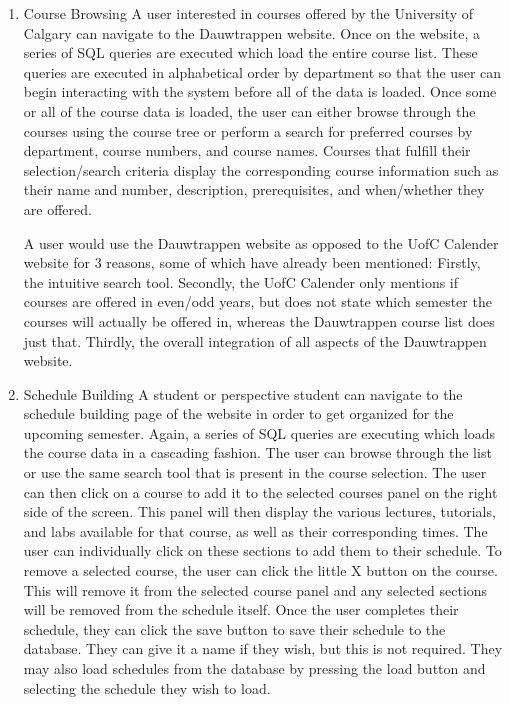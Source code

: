 \documentclass[twoside=false,a4paper,11pt]{article}
\theoremstyle{mytheor}
\begin{document}
\begin{enumerate}
	\item Course Browsing
	A user interested in courses offered by the University of Calgary can navigate to the Dauwtrappen website. Once on the website, a series of SQL queries are executed which load the entire course list. These queries are executed in alphabetical order by department so that the user can begin interacting with the system before all of the data is loaded.
	Once some or all of the course data is loaded, the user can either browse through the courses using the course tree or perform a search for preferred courses by department, course numbers, and course names. Courses that fulfill their selection/search criteria display the corresponding course information such as their name and number, description, prerequisites, and when/whether they are offered.

	A user would use the Dauwtrappen website as opposed to the UofC Calender website for 3 reasons, some of which have already been mentioned:
	Firstly, the intuitive search tool.
	Secondly, the UofC Calender only mentions if courses are offered in even/odd years, but does not state which semester the courses will actually be offered in, whereas the Dauwtrappen course list does just that.
	Thirdly, the overall integration of all aspects of the Dauwtrappen website.

	\item Schedule Building
	A student or perspective student can navigate to the schedule building page of the website in order to get organized for the upcoming semester. Again, a series of SQL queries are executing which loads the course data in a cascading fashion. The user can browse through the list or use the same search tool that is present in the course selection. 
	The user can then click on a course to add it to the selected courses panel on the right side of the screen. This panel will then display the various lectures, tutorials, and labs available for that course, as well as their corresponding times. The user can individually click on these sections to add them to their schedule. To remove a selected course, the user can click the little X button on the course. This will remove it from the selected course panel and any selected sections will be removed from the schedule itself. 
	Once the user completes their schedule, they can click the save button to save their schedule to the database. They can give it a name if they wish, but this is not required.
	They may also load schedules from the database by pressing the load button and selecting the schedule they wish to load.  


\end{enumerate}
\end{document}
